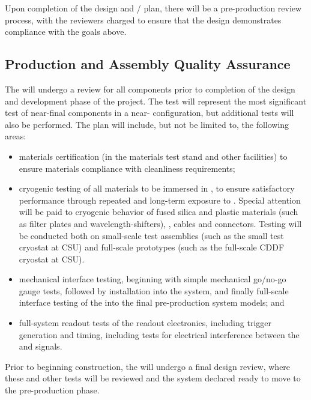 Upon completion of the  design and / plan, there will be a pre-production review process, with the reviewers charged to ensure that the design demonstrates compliance with the goals above.

\subsection{Production and Assembly Quality Assurance}
\label{sec:fdsp-pd-prodqa}

The  will undergo a  review for all components prior to completion of the design and development phase of the project.  The  test will represent the most significant test of near-final  components in a near- configuration, but additional tests will also be performed.  The  plan will include, but not be limited to, the following areas:

\begin{itemize}
\item materials certification (in the  materials test stand and other facilities) to ensure materials compliance with cleanliness requirements;
\item cryogenic testing of all materials to be immersed in , to ensure satisfactory performance through repeated and long-term exposure to .  Special attention will be paid to cryogenic behavior of fused silica and plastic materials (such as filter plates and wavelength-shifters), , cables and connectors.  Testing will be conducted both on small-scale test assemblies (such as the small test cryostat at CSU) and full-scale prototypes (such as the full-scale CDDF cryostat at CSU). 
\item mechanical interface testing, beginning with simple mechanical go/no-go gauge tests, followed by installation into the  system, and finally full-scale interface testing of the  into the final pre-production  system models; and
\item full-system readout tests of the  readout electronics, including trigger generation and timing, including tests for electrical interference between the  and  signals.
\end{itemize}


Prior to beginning construction, the  will undergo a final design review, where these and other  tests will be reviewed and the system declared ready to move to the pre-production phase.


